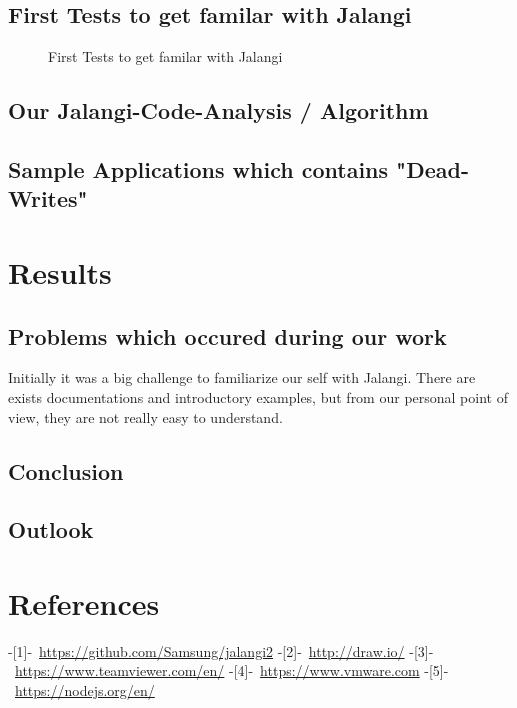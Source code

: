 \documentclass[a4paper]{scrartcl}
\begin{document}
\subsection{First Tests to get familar with Jalangi}
\begin{figure}[!htb]
  \centering 
   \qquad 
  \caption{First Tests to get familar with Jalangi } 
\end{figure}
\subsection{Our Jalangi-Code-Analysis / Algorithm}
\subsection{Sample Applications which contains "Dead-Writes"}
\pagebreak
\section{Results}
\subsection{Problems which occured during our work}
Initially it was a big challenge to familiarize our self with Jalangi. There are exists documentations and introductory examples, but from our personal point of view, they are not really easy to understand.
\subsection{Conclusion}
\subsection{Outlook}
\section{References}
\mbox{-[1]- \url{https://github.com/Samsung/jalangi2}}
\newline
\mbox{-[2]- \url{http://draw.io/}}
\newline
\mbox{-[3]- \url{https://www.teamviewer.com/en/}}
\newline
\mbox{-[4]- \url{https://www.vmware.com}}
\newline
\mbox{-[5]- \url{https://nodejs.org/en/}}
\end{document}
